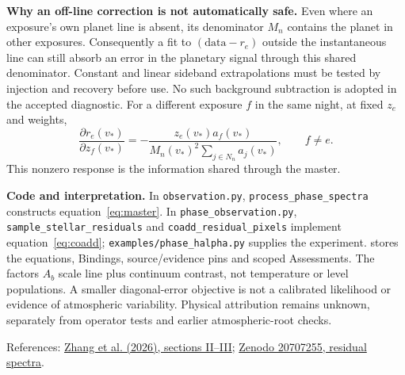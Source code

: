 \documentclass[10pt,a4paper]{article}
\begin{document}
\textbf{Why an off-line correction is not automatically safe.}
Even where an exposure's own planet line is absent, its denominator $M_n$
contains the planet in other exposures. Consequently a fit to
$(\mathrm{data}-r_e)$ outside the instantaneous line can still absorb an error
in the planetary signal through this shared denominator. Constant and linear
sideband extrapolations must be tested by injection and recovery before use.
No such background subtraction is adopted in the accepted diagnostic.
For a different exposure $f$ in the same night, at fixed $z_e$ and weights,
\begin{equation}
\frac{\partial r_e(v_*)}{\partial z_f(v_*)}
=-\frac{z_e(v_*)a_f(v_*)}
 {M_n(v_*)^2\sum_{j\in N_n}a_j(v_*)},\qquad f\ne e.
\label{eq:master-response}
\end{equation}
This nonzero response is the information shared through the master.

\textbf{Code and interpretation.}
In \texttt{observation.py}, \texttt{process\_phase\_spectra} constructs
equation~\eqref{eq:master}. In \texttt{phase\_observation.py},
\texttt{sample\_stellar\_residuals} and \texttt{coadd\_residual\_pixels}
implement equation~\eqref{eq:coadd};
\texttt{examples/phase\_halpha.py} supplies the experiment.
 stores the equations,
Bindings, source/evidence pins and scoped Assessments.
The factors $A_b$ scale line plus continuum contrast, not temperature or
level populations. A smaller diagonal-error objective is not a calibrated
likelihood or evidence of atmospheric variability. Physical attribution remains
unknown, separately from operator tests and earlier atmospheric-root checks.

\small References:
\href{https://arxiv.org/html/2606.23899v1#S2}{Zhang et al. (2026), sections II--III};
\href{https://doi.org/10.5281/zenodo.20707255}{Zenodo 20707255, residual spectra}.
\end{document}
